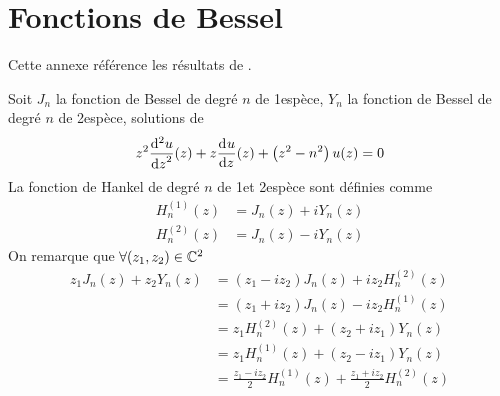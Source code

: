 \section{Fonctions de Bessel}

Cette annexe référence les résultats de \cite{abramowitz_handbook_1964}.

Soit \(J_n\) la fonction de Bessel de degré \(n\) de 1\iere espèce, \(Y_n\) la fonction de Bessel de degré \(n\) de 2\ieme espèce, solutions de
\begin{equation}
    z^2 \ddp[2]{z}{u}(z) + z\ddp{z}{u}(z)+\left(z^2-n^2\right)u(z) = 0
\end{equation}
La fonction de Hankel de degré \(n\) de 1\iere et 2\ieme espèce sont définies comme
\begin{align}
    H_n^{(1)}(z) &= J_n(z) + iY_n(z)\\
    H_n^{(2)}(z) &= J_n(z) - iY_n(z)
\end{align}
On remarque que \(\forall (z_1,z_2) \in \CC^2\)
\begin{equation}
\begin{aligned}
z_1 J_n(z) + z_2 Y_n(z)
&= ( z_1 - i z_2 ) J_n(z) + iz_2 H_n^{(2)}(z) \\
&= ( z_1 + i z_2 ) J_n(z) - iz_2 H_n^{(1)}(z) \\
&= z_1 H_n^{(2)}(z) + ( z_2 + i z_1 ) Y_n(z) \\
&= z_1 H_n^{(1)}(z) + ( z_2 - i z_1 ) Y_n(z) \\
&= \frac{z_1-iz_2}{2}H_n^{(1)}(z) + \frac{z_1+iz_2}{2}H_n^{(2)}(z)
\end{aligned}
\label{eq:annex:bessel:equiv_bessel}
\end{equation}
